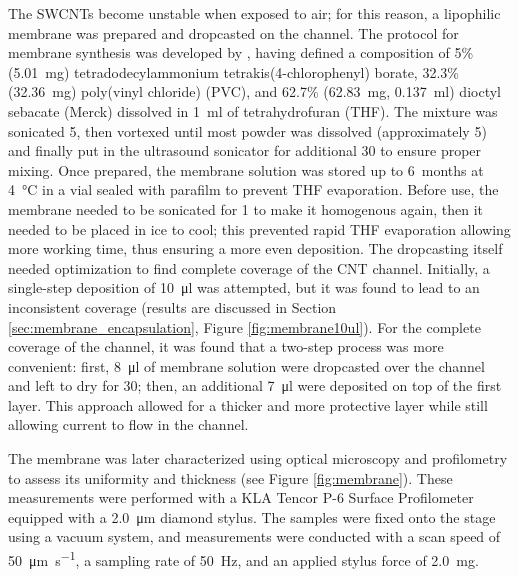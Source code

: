 The SWCNTs become unstable when exposed to air; for this reason, a lipophilic membrane was prepared and dropcasted on the channel.
The protocol for membrane synthesis was developed by \citet{joshiUsing2018}, having defined a composition of 5\% (\SI{5.01}{\mg}) tetradodecylammonium tetrakis(4-chlorophenyl) borate, 32.3\% (\SI{32.36}{\mg}) poly(vinyl chloride) (PVC), and 62.7\% (\SI{62.83}{\mg}, \ie{} \SI{0.137}{\ml}) dioctyl sebacate (Merck) dissolved in \SI{1}{\ml} of tetrahydrofuran (THF). The mixture was sonicated \SI{5}{\min}, then vortexed until most powder was dissolved (approximately \SI{5}{\min}) and finally put in the ultrasound sonicator for additional \SI{30}{\min} to ensure proper mixing. Once prepared, the membrane solution was stored up to \SI{6}{months} at \SI{4}{\degreeCelsius} in a vial sealed with parafilm to prevent THF evaporation. 
Before use, the membrane needed to be sonicated for \SI{1}{\min} to make it homogenous again, then it needed to be placed in ice to cool; this prevented rapid THF evaporation allowing more working time, thus ensuring a more even deposition. The dropcasting itself needed optimization to find complete coverage of the CNT channel. Initially, a single-step deposition of \SI{10}{\ul} was attempted, but it was found to lead to an inconsistent coverage (results are discussed in Section \ref{sec:membrane_encapsulation}, Figure \ref{fig:membrane10ul}). For the complete coverage of the channel, it was found that a two-step process was more convenient: first, \SI{8}{\ul} of membrane solution were dropcasted over the channel and left to dry for \SI{30}{\min}; then, an additional \SI{7}{\ul} were deposited on top of the first layer. This approach allowed for a thicker and more protective layer while still allowing current to flow in the channel.

The membrane was later characterized using optical microscopy and profilometry to assess its uniformity and thickness (see Figure \ref{fig:membrane}). These measurements were performed with a KLA Tencor P-6 Surface Profilometer equipped with a \SI{2.0}{\um} diamond stylus. The samples were fixed onto the stage using a vacuum system, and measurements were conducted with a scan speed of \SI{50}{\um\per\second}, a sampling rate of \SI{50}{\hertz}, and an applied stylus force of \SI{2.0}{\mg}.

